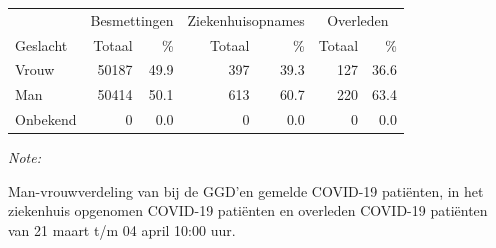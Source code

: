 \documentclass[
  english,
  man,floatsintext]{apa6}
\begin{document}
\begin{table}
\centering\begingroup\fontsize{11}{13}\selectfont

\begin{threeparttable}
\begin{tabular}{lrrrrrr}
\toprule
\multicolumn{1}{c}{ } & \multicolumn{2}{c}{Besmettingen} & \multicolumn{2}{c}{Ziekenhuisopnames} & \multicolumn{2}{c}{Overleden} \\
\cmidrule(l{3pt}r{3pt}){2-3} \cmidrule(l{3pt}r{3pt}){4-5} \cmidrule(l{3pt}r{3pt}){6-7}
Geslacht & Totaal & \% & Totaal & \% & Totaal & \%\\
\midrule
Vrouw & 50187 & 49.9 & 397 & 39.3 & 127 & 36.6\\
Man & 50414 & 50.1 & 613 & 60.7 & 220 & 63.4\\
Onbekend & 0 & 0.0 & 0 & 0.0 & 0 & 0.0\\
\bottomrule
\end{tabular}
\begin{tablenotes}
\item \textit{Note: } 
\item Man-vrouwverdeling van bij de GGD’en gemelde COVID-19 patiënten, in het ziekenhuis opgenomen COVID-19 patiënten en overleden COVID-19 patiënten van 21 maart t/m 04 april 10:00 uur.
\end{tablenotes}
\end{threeparttable}
\endgroup{}
\end{table}
\newpage
\end{document}
